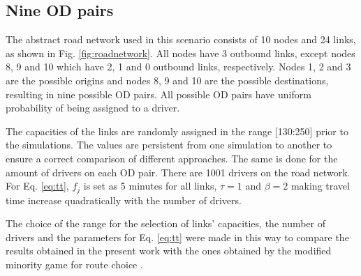 \documentclass{RITA}
\newcommand{\fftt}{\ensuremath{f_j}} 		%
\begin{document}
\subsection{Nine OD pairs}
\label{sec:nineODDescription}
The abstract road network used in this scenario consists of 10 nodes and 24 links, as shown in Fig. \ref{fig:roadnetwork}. All nodes have 3 outbound links, except nodes 8, 9 and 10 which have 2, 1 and 0 outbound links, respectively. Nodes 1, 2 and 3 are the possible origins and nodes 8, 9 and 10 are the possible destinations, resulting in nine possible OD pairs. All possible OD pairs have uniform probability of being assigned to a driver. %


The capacities of the links are randomly assigned in the range [130:250] prior to the simulations. The values are persistent from one simulation to another to ensure a correct comparison of different approaches. The same is done for the amount of drivers on each OD pair. There are 1001 drivers on the road network. For Eq. \eqref{eq:tt}, $\fftt$ is set as 5 minutes for all links, $\tau = 1$ and $\beta = 2$ making travel time increase quadratically with the number of drivers. 

The choice of the range for the selection of links' capacities, the number of drivers and the parameters for Eq. \eqref{eq:tt} were made in this way to compare the results obtained in the present work with the ones obtained by the modified minority game for route choice \cite{Galib&Moser2011}.
\end{document}
